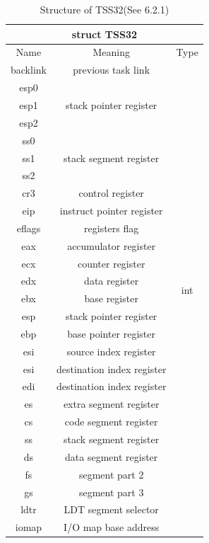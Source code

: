 \documentclass{swfcthesis}
\begin{document}
\begin{table}[!htbp]
  \centering
  \begin{tabular}{|c|c|c|}
    \hline
    \multicolumn{3}{|c|}{struct TSS32} \\
    \hline
    Name & Meaning & Type \\
    \hline
    backlink & previous task link & \multirow{26}{*}{int} \\
    \cline{1-2}
    esp0 & \multirow{3}{*}{stack pointer register} & \\
    esp1 & & \\
    esp2 & & \\
    \cline{1-2}
    ss0 & \multirow{3}{*}{stack segment register} & \\
    ss1 & & \\
    ss2 & & \\
    \cline{1-2}
    cr3 & control register & \\
    \cline{1-2}
    eip & instruct pointer register & \\
    \cline{1-2}
    eflags & registers flag & \\
    \cline{1-2}
    eax & accumulator register & \\
    \cline{1-2}
    ecx & counter register & \\
    \cline{1-2}
    edx & data register & \\
    \cline{1-2}
    ebx & base register & \\
    \cline{1-2}
    esp & stack pointer register & \\
    \cline{1-2}
    ebp & base pointer register & \\
    \cline{1-2}
    esi & source index register & \\
    \cline{1-2}
    esi & destination index register & \\
    \cline{1-2}
    edi & destination index register & \\
    \cline{1-2}
    es & extra segment register & \\
    \cline{1-2}
    cs & code segment register & \\
    \cline{1-2}
    ss & stack segment register & \\
    \cline{1-2}
    ds & data segment register & \\
    \cline{1-2}
    fs & segment part 2 & \\
    \cline{1-2}
    gs & segment part 3 & \\
    \cline{1-2}
    ldtr & LDT segment selector & \\
    \cline{1-2}
    iomap & I/O map base address & \\
    \hline
    
  \end{tabular}
  \caption{Structure of TSS32(See 6.2.1\cite{intel_3a})}
  \label{tab:TSS32}
\end{table}
\end{document}
